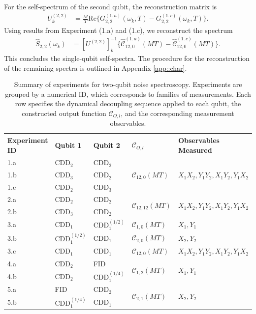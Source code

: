 \documentclass[%
 reprint,
superscriptaddress,
 amsmath,amssymb,
 aps,
pra,
floatfix,
]{revtex4-2}
\begin{document}
For the self-spectrum of the second qubit, the reconstruction matrix is
\begin{align}
    U_{k}^{(2,2)}&=\frac{M}{T}\text{Re}\Big\{G_{2,2}^{(1.\,a)}(\omega_k, T) - G_{2,2}^{(1.\,c)}(\omega_k, T)\Big\}.
\end{align}
Using results from Experiment (1.a) and (1.c), we reconstruct the spectrum
\begin{align}
    \hat{S}_{2,2}(\omega_k) &= [U^{(2,2)}]^{-1}_{k}\Big\{\hat{\mathcal{C}}_{12,0}^{(1.\,a)}(MT) - \hat{\mathcal{C}}_{12,0}^{(1.\,c)}(MT)\Big\}.
\end{align}
This concludes the single-qubit self-spectra. The procedure for the reconstruction of the remaining spectra is outlined in Appendix \ref{app::char}.
\begin{table}[h]
    \centering
    \caption{Summary of experiments for two-qubit noise spectroscopy. Experiments are grouped by a numerical ID, which corresponds to families of measurements. Each row specifies the dynamical decoupling sequence applied to each qubit, the constructed output function $\mathcal{C}_{O,l}$, and the corresponding measurement observables.}
    \label{tab:exps}
    \begin{tabular}{@{}lllll@{}}
        \toprule
        \textbf{Experiment ID} & \textbf{Qubit 1} & \textbf{Qubit 2} & \textbf{$\mathcal{C}_{O,l}$} & \textbf{Observables Measured} \\
        \midrule
        1.a & $\text{CDD}_2$ & $\text{CDD}_2$ & \multirow{3}{*}{$\mathcal{C}_{12,0}(MT)$} & \multirow{3}{*}{$X_1X_2, Y_1Y_2, X_1Y_2, Y_1X_2$} \\
        1.b & $\text{CDD}_3$ & $\text{CDD}_2$ & & \\
        1.c & $\text{CDD}_2$ & $\text{CDD}_3$ & & \\
        \midrule
        2.a & $\text{CDD}_2$ & $\text{CDD}_2$ & \multirow{2}{*}{$\mathcal{C}_{12,12}(MT)$} & \multirow{2}{*}{$X_1X_2, Y_1Y_2, X_1Y_2, Y_1X_2$} \\
        2.b & $\text{CDD}_3$ & $\text{CDD}_2$ & & \\
        \midrule
        3.a & $\text{CDD}_1$ & $\text{CDD}_1^{(1/2)}$ & $\mathcal{C}_{1,0}(MT)$ & $X_1, Y_1$ \\
        3.b & $\text{CDD}_1^{(1/2)}$ & $\text{CDD}_1$ & $\mathcal{C}_{2,0}(MT)$ & $X_2, Y_2$ \\
        3.c & $\text{CDD}_1$ & $\text{CDD}_1$ & $\mathcal{C}_{12,0}(MT)$ & $X_1X_2, Y_1Y_2, X_1Y_2, Y_1X_2$ \\
        \midrule
        4.a & $\text{CDD}_2$ & FID & \multirow{2}{*}{$\mathcal{C}_{1,2}(MT)$} & \multirow{2}{*}{$X_1, Y_1$} \\
        4.b & $\text{CDD}_2$ & $\text{CDD}_1^{(1/4)}$ & & \\
        \midrule
        5.a & FID & $\text{CDD}_2$ & \multirow{2}{*}{$\mathcal{C}_{2,1}(MT)$} & \multirow{2}{*}{$X_2, Y_2$} \\
        5.b & $\text{CDD}_1^{(1/4)}$ & $\text{CDD}_1$ & & \\
        \bottomrule
    \end{tabular}
\end{table}
\end{document}
